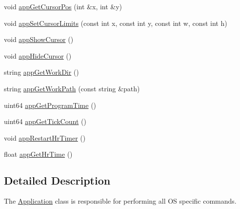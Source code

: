 \begin{DoxyCompactItemize}
\item 
void \hyperlink{class_application_ae8413053cc785729c125b53279d14576}{app\-Get\-Cursor\-Pos} (int \&x, int \&y)
\item 
void \hyperlink{class_application_aec8bf350bbbb3407ed11ebb6b93b7344}{app\-Set\-Cursor\-Limits} (const int x, const int y, const int w, const int h)
\item 
void \hyperlink{class_application_ad0ea87041394ca4c46cd4dbb1011ad84}{app\-Show\-Cursor} ()
\item 
void \hyperlink{class_application_ae4db1227dcce1acae1faf72f92e73467}{app\-Hide\-Cursor} ()
\item 
string \hyperlink{class_application_ac37e92d1ad361e95f9e029949f9aaccd}{app\-Get\-Work\-Dir} ()
\item 
string \hyperlink{class_application_a5847e38189cc6473ef63162c439d7785}{app\-Get\-Work\-Path} (const string \&path)
\item 
uint64 \hyperlink{class_application_a8ed7c9b0cb21e8480e8aef57b142cbed}{app\-Get\-Program\-Time} ()
\item 
uint64 \hyperlink{class_application_a2ae34cff29efc98e9e66b53a345a85f2}{app\-Get\-Tick\-Count} ()
\item 
void \hyperlink{class_application_a1aace92c00cdf019658db7d2e6b69565}{app\-Restart\-Hr\-Timer} ()
\item 
float \hyperlink{class_application_a2502735d4b414fe1d3fa193772e7608a}{app\-Get\-Hr\-Time} ()
\end{DoxyCompactItemize}


\subsection{Detailed Description}
The \hyperlink{class_application}{Application} class is responsible for performing all O\-S specific commands. 

